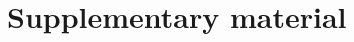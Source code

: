 \documentclass[twocolumn, letterpaper]{igs}
\begin{document}
%

%


\pagebreak 
\section{Supplementary material}

\end{document}
